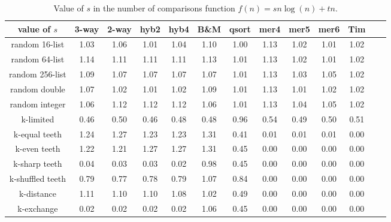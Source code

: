 \documentclass[AMA,STIX1COL]{WileyNJD-v2}
\begin{document}
\begin{table}
\caption{Value of $s$ in the number of comparisons function $f(n) = sn\log(n) + tn$.}
\centering
\begin{tabular}{|c|c|c|c|c|c|c|c|c|c|c|c|c|}
\toprule
value of $s$ & 3-way & 2-way & hyb2 & hyb4 & B\&M& qsort & mer4 & mer5 & mer6 & Tim \\
\midrule
random 16-list	&1.03&	1.06&	1.01&	1.04&	1.10&	1.00&	1.13&	1.02&	1.01&	1.02\\
random 64-list&1.14	&1.11	&1.11	&1.11	&1.13	&1.01	&1.13	&1.02	&1.01	&1.02\\
random 256-list&	1.09&	1.07&	1.07&	1.07&	1.07&	1.01&	1.13&	1.03&	1.05&	1.02\\
random double&	1.07	&1.02	&1.01	&1.02	&1.09	&1.01	&1.13	&1.01	&1.02	&1.02\\
random integer&	1.06	&1.12&	1.12&	1.12&	1.06&	1.01&	1.13&	1.04&	1.05&	1.02\\
k-limited&	0.46	&0.50	&0.46	&0.48	&0.48	&0.96	&0.54	&0.49	&0.50	&0.51\\
k-equal teeth&	1.24&	1.27&	1.23&	1.23&	1.31&	0.41&	0.01&	0.01&	0.01&	0.00\\
k-even teeth&	1.22	&1.21	&1.27	&1.27	&1.31	&0.45	&0.00	&0.00	&0.00	&0.00\\
k-sharp teeth&	0.04	&0.03&	0.03&	0.02&	0.98&	0.45&	0.00&	0.00	&0.00	&0.00\\
k-shuffled teeth&	0.79	&0.77	&0.78	&0.79	&1.07	&0.84	&0.00	&0.00	&0.00	&0.00\\
k-distance&	1.11	&1.10&	1.10&	1.08&	1.02&	0.49&	0.00&	0.00&	0.00&	0.00\\
k-exchange&	0.02	&0.02	&0.02	&0.02	&1.06	&0.45	&0.00	&0.00	&0.00	&0.00\\
\bottomrule
\end{tabular}
\label{table5}
\end{table}
\end{document}
